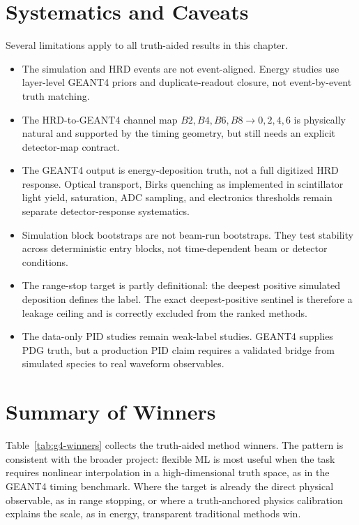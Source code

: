 \section{Systematics and Caveats}

Several limitations apply to all truth-aided results in this chapter.

\begin{itemize}
\item The simulation and HRD events are not event-aligned. Energy studies use
layer-level GEANT4 priors and duplicate-readout closure, not event-by-event
truth matching.
\item The HRD-to-GEANT4 channel map \(B2,B4,B6,B8\to0,2,4,6\) is physically
natural and supported by the timing geometry, but still needs an explicit
detector-map contract.
\item The GEANT4 output is energy-deposition truth, not a full digitized HRD
response. Optical transport, Birks quenching as implemented in scintillator
light yield, saturation, ADC sampling, and electronics thresholds remain
separate detector-response systematics.
\item Simulation block bootstraps are not beam-run bootstraps. They test
stability across deterministic entry blocks, not time-dependent beam or detector
conditions.
\item The range-stop target is partly definitional: the deepest positive
simulated deposition defines the label. The exact deepest-positive sentinel is
therefore a leakage ceiling and is correctly excluded from the ranked methods.
\item The data-only PID studies remain weak-label studies. GEANT4 supplies PDG
truth, but a production PID claim requires a validated bridge from simulated
species to real waveform observables.
\end{itemize}

\section{Summary of Winners}

Table~\ref{tab:g4-winners} collects the truth-aided method winners. The pattern
is consistent with the broader project: flexible ML is most useful when the task
requires nonlinear interpolation in a high-dimensional truth space, as in the
GEANT4 timing benchmark. Where the target is already the direct physical
observable, as in range stopping, or where a truth-anchored physics calibration
explains the scale, as in energy, transparent traditional methods win.

